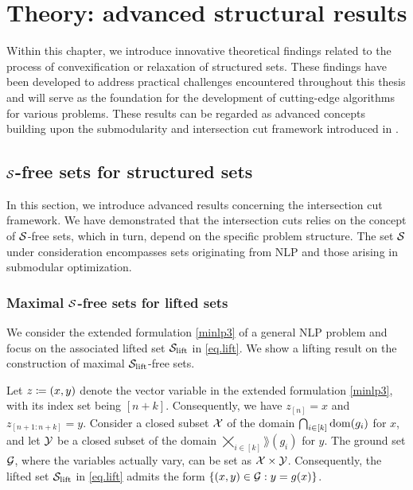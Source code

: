 \chapter{Theory: advanced structural results}
\label{chap.theorystructure}



Within this chapter, we introduce innovative theoretical findings related to the process of convexification or relaxation of structured sets. These findings have been developed to address practical challenges encountered throughout this thesis and will serve as the foundation for the development of cutting-edge algorithms for various problems. These results can be regarded as advanced concepts building upon the submodularity and intersection cut framework introduced in .

\section{$\mathcal S$-free sets for structured sets}
\label{sec.advanced}

In this section, we introduce advanced results concerning the intersection cut framework. We have demonstrated that the intersection cuts relies on the concept of $\mathcal S$-free sets, which in turn, depend on the specific problem structure. The set $\mathcal S$ under consideration encompasses sets originating from NLP and those arising in submodular optimization.


\subsection{Maximal $\mathcal S$-free sets for lifted sets}
\label{sec.lift}
We  consider  the extended formulation \eqref{minlp3} of a general NLP problem and focus on the associated lifted set $\mathcal S_{\mathrm{lift}}$ in \eqref{eq.lift}.  We show a lifting result on the construction of maximal $\mathcal S_{\mathrm{lift}}$-free sets.



Let $z\coloneqq(x,y)$ denote the vector variable in the extended formulation \eqref{minlp3}, with its index set being $[n+k]$. Consequently, we have $z_{[n]} = x$ and $z_{[n+1:n+k]} = y$. Consider a closed subset $\mathcal X$ of the domain $\bigcap_{i \in [k]} \operatorname{dom}(g_i)$ for $x$, and let $\mathcal Y$ be a closed subset of the domain $\bigtimes_{i \in [k]} \rang(g_i)$ for $y$. The ground set $\mathcal G$, where the variables actually vary, can be set as $\mathcal X \times \mathcal Y$. Consequently, the lifted set $\mathcal S_{\mathrm{lift}}$ in \eqref{eq.lift} admits the form $\{(x,y) \in \mathcal G: y = g(x)\}$.

